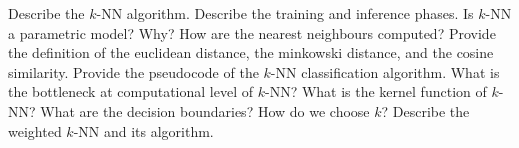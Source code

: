 \newpage
\begin{exercise}[topsep=20pt,itemsep=10pt]
    \ex Describe the \(k\)-NN algorithm.
    \ex[!] Describe the training and inference phases.
    \ex[!] Is \(k\)-NN a parametric model? Why?
    \ex How are the nearest neighbours computed? Provide the definition of the euclidean distance, the minkowski distance, and the cosine similarity.
    \ex Provide the pseudocode of the \(k\)-NN classification algorithm.
    \ex What is the bottleneck at computational level of \(k\)-NN?
    \ex What is the kernel function of \(k\)-NN?
    \ex What are the decision boundaries?
    \ex How do we choose \(k\)?
    \ex Describe the weighted \(k\)-NN and its algorithm.
\end{exercise}